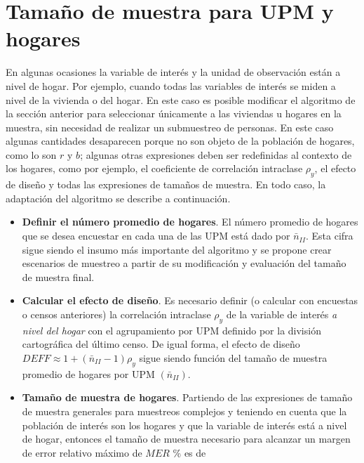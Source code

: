 \documentclass[
  12pt,
]{book}
\begin{document}
\hypertarget{tamauxf1o-de-muestra-para-upm-y-hogares}{%
\section{Tamaño de muestra para UPM y hogares}\label{tamauxf1o-de-muestra-para-upm-y-hogares}}

En algunas ocasiones la variable de interés y la unidad de observación están a nivel de hogar. Por ejemplo, cuando todas las variables de interés se miden a nivel de la vivienda o del hogar. En este caso es posible modificar el algoritmo de la sección anterior para seleccionar únicamente a las viviendas u hogares en la muestra, sin necesidad de realizar un submuestreo de personas. En este caso algunas cantidades desaparecen porque no son objeto de la población de hogares, como lo son \(r\) y \(b\); algunas otras expresiones deben ser redefinidas al contexto de los hogares, como por ejemplo, el coeficiente de correlación intraclase \(\rho_y\), el efecto de diseño y todas las expresiones de tamaños de muestra. En todo caso, la adaptación del algoritmo se describe a continuación.

\begin{itemize}
\item
  \textbf{Definir el número promedio de hogares}. El número promedio de hogares que se desea encuestar en cada una de las UPM está dado por \(\bar{n}_{II}\). Esta cifra sigue siendo el insumo más importante del algoritmo y se propone crear escenarios de muestreo a partir de su modificación y evaluación del tamaño de muestra final.
\item
  \textbf{Calcular el efecto de diseño}. Es necesario definir (o calcular con encuestas o censos anteriores) la correlación intraclase \(\rho_y\) de la variable de interés \emph{a nivel del hogar} con el agrupamiento por UPM definido por la división cartográfica del último censo. De igual forma, el efecto de diseño \(DEFF \approx 1 + (\bar{n}_{II} - 1)\rho_y\) sigue siendo función del tamaño de muestra promedio de hogares por UPM \((\bar{n}_{II})\).
\item
  \textbf{Tamaño de muestra de hogares}. Partiendo de las expresiones de tamaño de muestra generales para muestreos complejos y teniendo en cuenta que la población de interés son los hogares y que la variable de interés está a nivel de hogar, entonces el tamaño de muestra necesario para alcanzar un margen de error relativo máximo de \(MER\) \% es de
\end{itemize}
\end{document}
